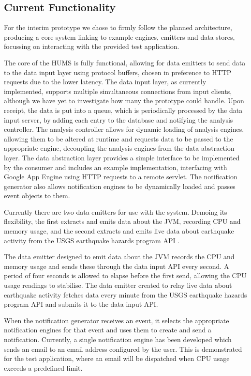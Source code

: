 \documentclass[10pt,a4paper]{article}
\begin{document}
\subsection{Current Functionality}
For the interim prototype we chose to firmly follow the planned architecture, producing a core system linking to example engines, emitters and data stores, focussing on interacting with the provided test application.

The core of the HUMS is fully functional, allowing for data emitters to send data to the data input layer using protocol buffers, chosen in preference to HTTP requests due to the lower latency. The data input layer, as currently implemented, supports multiple simultaneous connections from input clients, although we have yet to investigate how many the prototype could handle. Upon receipt, the data is put into a queue, which is periodically processed by the data input server, by adding each entry to the database and notifying the analysis controller. The analysis controller allows for dynamic loading of analysis engines, allowing them to be altered at runtime and requests data to be passed to the appropriate engine, decoupling the analysis engines from the data abstraction layer. The data abstraction layer provides a simple interface to be implemented by the consumer and includes an example implementation, interfacing with Google App Engine using HTTP requests to a remote servlet. The notification generator also allows notification engines to be dynamically loaded and passes event objects to them.

Currently there are two data emitters for use with the system. Demoing its flexibility, the first extracts and emits data about the JVM, recording CPU and memory usage, and the second extracts and emits live data about earthquake activity from the USGS earthquake hazards program API \cite{usgs}.

The data emitter designed to emit data about the JVM records the CPU and memory usage and sends these through the data input API every second. A period of four seconds is allowed to elapse before the first send, allowing the CPU usage readings to stabilise. The data emitter created to relay live data about earthquake activity fetches data every minute from the USGS earthquake hazards program API and submits it to the data input API.


When the notification generator receives an event, it selects the appropriate notification engines for that event and uses them to create and send a notification. Currently, a single notification engine has been developed which sends an email to an email address configured by the user. This is demonstrated for the test application, where an email will be dispatched when CPU usage exceeds a predefined limit.
\end{document}
